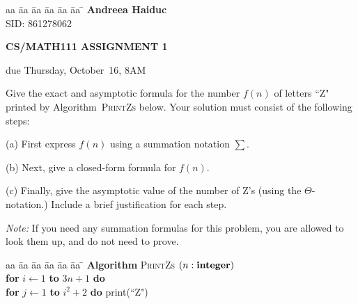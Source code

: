 \documentclass{article}
\begin{document}
\begin{tabbing}
aa \= aa \= aa \= aa \= aa \= aa \= \kill
\textbf{Andreea Haiduc} \\
{SID: 861278062} \\
\end{tabbing}

\centerline{ \large \bf CS/MATH111 ASSIGNMENT 1}
\centerline{due Thursday, October~16, 8AM}

\vskip 0.1in


\vskip 0.2in


\begin{problem}
Give the exact and asymptotic formula for the number $f(n)$ of
letters ``Z" printed by Algorithm~\textsc{PrintZs} below.
Your solution must consist of the following steps:
%
\begin{description}
\item{(a)} First express $f(n)$ using a summation notation $\sum$.
\item{(b)} Next, give a closed-form formula for $f(n)$.
\item{(c)}  Finally, give the asymptotic value of the
number of Z's (using the $\Theta$-notation.) Include a brief justification for
each step. 
\end{description}

\smallskip
\noindent
\emph{Note:} If you need any summation formulas for this problem, you are allowed to
look them up, and do not need to prove.

\begin{tabbing}
aa \= aa \= aa \= aa \= aa \= aa \= \kill
\textbf{Algorithm} \textsc{PrintZs} $(n: \mbox{\bf integer})$ \\
      \> \textbf{for} $i \leftarrow 1$ \textbf{to} $3n+1$
                         \textbf{do} \\
      \> \> \textbf{for} $j \leftarrow 1$ \textbf{to} $i^2+2$ \textbf{do} print(``Z")
\end{tabbing}


\end{problem}
\end{document}
